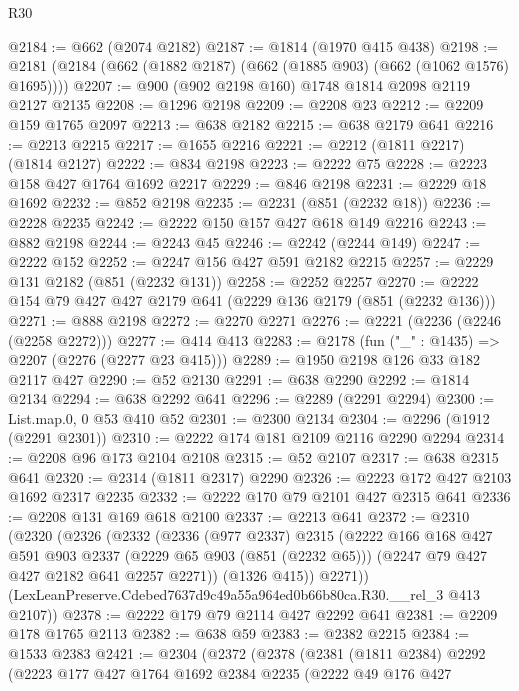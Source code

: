 \begin{lexlean}{R30}
\begin{coremodule}
@2184 := @662 (@2074 @2182)
@2187 := @1814 (@1970 @415 @438)
@2198 := @2181 (@2184 (@662 (@1882 @2187) (@662 (@1885 @903) (@662 (@1062 @1576) @1695))))
@2207 := @900 (@902 @2198 @160) @1748 @1814 @2098 @2119 @2127 @2135
@2208 := @1296 @2198
@2209 := @2208 @23
@2212 := @2209 @159 @1765 @2097
@2213 := @638 @2182
@2215 := @638 @2179 @641
@2216 := @2213 @2215
@2217 := @1655 @2216
@2221 := @2212 (@1811 @2217) (@1814 @2127)
@2222 := @834 @2198
@2223 := @2222 @75
@2228 := @2223 @158 @427 @1764 @1692 @2217
@2229 := @846 @2198
@2231 := @2229 @18 @1692
@2232 := @852 @2198
@2235 := @2231 (@851 (@2232 @18))
@2236 := @2228 @2235
@2242 := @2222 @150 @157 @427 @618 @149 @2216
@2243 := @882 @2198
@2244 := @2243 @45
@2246 := @2242 (@2244 @149)
@2247 := @2222 @152
@2252 := @2247 @156 @427 @591 @2182 @2215
@2257 := @2229 @131 @2182 (@851 (@2232 @131))
@2258 := @2252 @2257
@2270 := @2222 @154 @79 @427 @427 @2179 @641 (@2229 @136 @2179 (@851 (@2232 @136)))
@2271 := @888 @2198
@2272 := @2270 @2271
@2276 := @2221 (@2236 (@2246 (@2258 @2272)))
@2277 := @414 @413
@2283 := @2178 (fun ("_" : @1435) => @2207 (@2276 (@2277 @23 @415)))
@2289 := @1950 @2198 @126 @33 @182 @2117 @427
@2290 := @52 @2130
@2291 := @638 @2290
@2292 := @1814 @2134
@2294 := @638 @2292 @641
@2296 := @2289 (@2291 @2294)
@2300 := List.map.{0, 0} @53 @410 @52
@2301 := @2300 @2134
@2304 := @2296 (@1912 (@2291 @2301))
@2310 := @2222 @174 @181 @2109 @2116 @2290 @2294
@2314 := @2208 @96 @173 @2104 @2108
@2315 := @52 @2107
@2317 := @638 @2315 @641
@2320 := @2314 (@1811 @2317) @2290
@2326 := @2223 @172 @427 @2103 @1692 @2317 @2235
@2332 := @2222 @170 @79 @2101 @427 @2315 @641
@2336 := @2208 @131 @169 @618 @2100
@2337 := @2213 @641
@2372 := @2310
    (@2320
      (@2326
        (@2332
          (@2336
            (@977 @2337)
            @2315
            (@2222
              @166
              @168
              @427
              @591
              @903
              @2337
              (@2229 @65 @903 (@851 (@2232 @65)))
              (@2247 @79 @427 @427 @2182 @641 @2257 @2271))
            (@1326 @415))
          @2271))
      (LexLeanPreserve.Cdebed7637d9c49a55a964ed0b66b80ca.R30.__rel_3 @413 @2107))
@2378 := @2222 @179 @79 @2114 @427 @2292 @641
@2381 := @2209 @178 @1765 @2113
@2382 := @638 @59
@2383 := @2382 @2215
@2384 := @1533 @2383
@2421 := @2304
    (@2372
      (@2378
        (@2381
          (@1811 @2384)
          @2292
          (@2223
            @177
            @427
            @1764
            @1692
            @2384
            @2235
            (@2222
              @49
              @176
              @427

\end{coremodule}
\end{lexlean}

